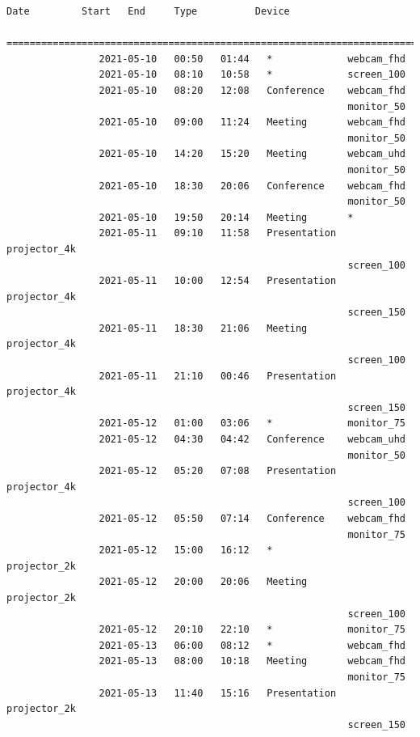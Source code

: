 \documentclass{article}
\begin{document}
\begin{Verbatim}[gobble=8]
                Date         Start   End     Type          Device
                ===========================================================================
                2021-05-10   00:50   01:44   *             webcam_fhd
                2021-05-10   08:10   10:58   *             screen_100
                2021-05-10   08:20   12:08   Conference    webcam_fhd
                                                           monitor_50
                2021-05-10   09:00   11:24   Meeting       webcam_fhd
                                                           monitor_50
                2021-05-10   14:20   15:20   Meeting       webcam_uhd
                                                           monitor_50
                2021-05-10   18:30   20:06   Conference    webcam_fhd
                                                           monitor_50
                2021-05-10   19:50   20:14   Meeting       *
                2021-05-11   09:10   11:58   Presentation  projector_4k
                                                           screen_100
                2021-05-11   10:00   12:54   Presentation  projector_4k
                                                           screen_150
                2021-05-11   18:30   21:06   Meeting       projector_4k
                                                           screen_100
                2021-05-11   21:10   00:46   Presentation  projector_4k
                                                           screen_150
                2021-05-12   01:00   03:06   *             monitor_75
                2021-05-12   04:30   04:42   Conference    webcam_uhd
                                                           monitor_50
                2021-05-12   05:20   07:08   Presentation  projector_4k
                                                           screen_100
                2021-05-12   05:50   07:14   Conference    webcam_fhd
                                                           monitor_75
                2021-05-12   15:00   16:12   *             projector_2k
                2021-05-12   20:00   20:06   Meeting       projector_2k
                                                           screen_100
                2021-05-12   20:10   22:10   *             monitor_75
                2021-05-13   06:00   08:12   *             webcam_fhd
                2021-05-13   08:00   10:18   Meeting       webcam_fhd
                                                           monitor_75
                2021-05-13   11:40   15:16   Presentation  projector_2k
                                                           screen_150

\end{Verbatim}
\end{document}
